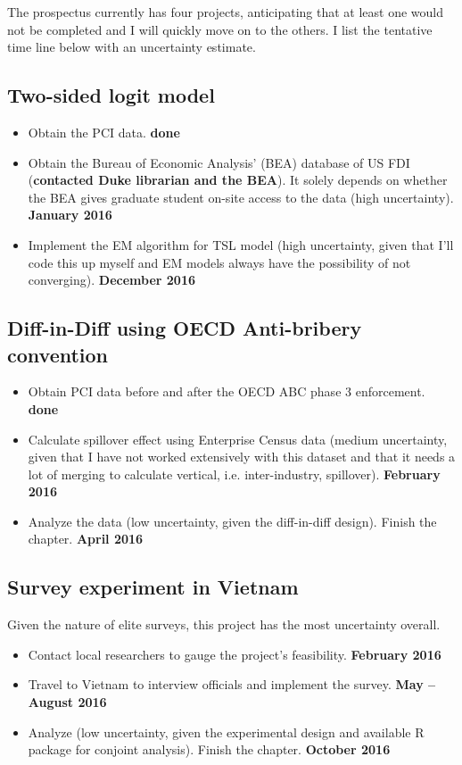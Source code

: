 The prospectus currently has four projects, anticipating that at least one would not be completed and I will quickly move on to the others. I list the tentative time line below with an uncertainty estimate.

\subsection{Two-sided logit model}
\begin{itemize}
\item Obtain the PCI data. \textbf{done}
\item Obtain the Bureau of Economic Analysis' (BEA) database of US FDI (\textbf{contacted Duke librarian and the BEA}). It solely depends on whether the BEA gives graduate student on-site access to the data (high uncertainty). \textbf{January 2016}
\item Implement the EM algorithm for TSL model (high uncertainty, given that I'll code this up myself and EM models always have the possibility of not converging). \textbf{December 2016}
\end{itemize}

\subsection{Diff-in-Diff using OECD Anti-bribery convention}

\begin{itemize}
\item Obtain PCI data before and after the OECD ABC phase 3 enforcement. \textbf{done}
\item Calculate spillover effect using Enterprise Census data (medium uncertainty, given that I have not worked extensively with this dataset and that it needs a lot of merging to calculate vertical, i.e. inter-industry, spillover). \textbf{February 2016}
\item Analyze the data (low uncertainty, given the diff-in-diff design). Finish the chapter. \textbf{April 2016}
\end{itemize}

\subsection{Survey experiment in Vietnam}

Given the nature of elite surveys, this project has the most uncertainty overall.

\begin{itemize}
\item Contact local researchers to gauge the project's feasibility. \textbf{February 2016}
\item Travel to Vietnam to interview officials and implement the survey. \textbf{May -- August 2016}
\item Analyze (low uncertainty, given the experimental design and available R package for conjoint analysis). Finish the chapter. \textbf{October 2016}
\end{itemize}

